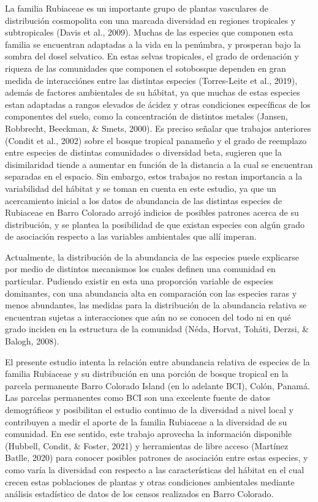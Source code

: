 \documentclass[11pt,]{article}
\begin{document}
La familia Rubiaceae es un importante grupo de plantas vasculares de
distribución cosmopolita con una marcada diversidad en regiones
tropicales y subtropicales (Davis et al., 2009). Muchas de las especies
que componen esta familia se encuentran adaptadas a la vida en la
penúmbra, y prosperan bajo la sombra del dosel selvatico. En estas
selvas tropicales, el grado de ordenación y riqueza de las comunidades
que componen el sotobosque dependen en gran medida de interacciónes
entre las distintas especies (Torres-Leite et al., 2019), además de
factores ambientales de su hábitat, ya que muchas de estas especies
estan adaptadas a rangos elevados de ácidez y otras condiciones
específicas de los componentes del suelo, como la concentración de
distintos metales (Jansen, Robbrecht, Beeckman, \& Smets, 2000). Es
preciso señalar que trabajos anteriores (Condit et al., 2002) sobre el
bosque tropical panameño y el grado de reemplazo entre especies de
distintas comunidades o diversidad beta, sugieren que la disimilaridad
tiende a aumentar en función de la distancia a la cual se encuentran
separadas en el espacio. Sin embargo, estos trabajos no restan
importancia a la variabilidad del hábitat y se toman en cuenta en este
estudio, ya que un acercamiento inicial a los datos de abundancia de las
distintas especies de Rubiaceae en Barro Colorado arrojó indicios de
posibles patrones acerca de su distribución, y se plantea la posibilidad
de que existan especies con algún grado de asociación respecto a las
variables ambientales que allí imperan.

Actualmente, la distribución de la abundancia de las especies puede
explicarse por medio de distintos mecanismos los cuales definen una
comunidad en particular. Pudiendo existir en esta una proporción
variable de especies dominantes, con una abundancia alta en comparación
con las especies raras y menos abundantes, las medidas para la
distribución de la abundancia relativa se encuentran sujetas a
interacciones que aún no se conocen del todo ni en qué grado inciden en
la estructura de la comunidad (Néda, Horvat, Toháti, Derzsi, \& Balogh,
2008).

El presente estudio intenta la relación entre abundancia relativa de
especies de la familia Rubiaceae y su distribución en una porción de
bosque tropical en la parcela permanente Barro Colorado Island (en lo
adelante BCI), Colón, Panamá. Las parcelas permanentes como BCI son una
excelente fuente de datos demográficos y posibilitan el estudio continuo
de la diversidad a nivel local y contribuyen a medir el aporte de la
familia Rubiaceae a la diversidad de su comunidad. En ese sentido, este
trabajo aprovecha la información disponible (Hubbell, Condit, \& Foster,
2021) y herramientas de libre acceso (Martínez Batlle, 2020) para
conocer posibles patrones de asociación entre estas especies, y como
varía la diversidad con respecto a las características del hábitat en el
cual crecen estas poblaciones de plantas y otras condiciones ambientales
mediante análisis estadístico de datos de los censos realizados en Barro
Colorado.
\end{document}
